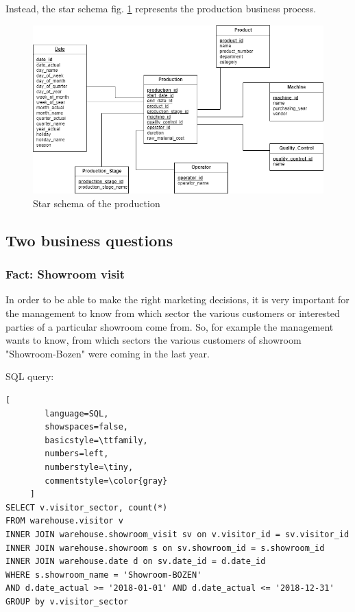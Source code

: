 \documentclass[letterpaper,12pt]{article}
\begin{document}
Instead, the star schema fig. \ref{fig:starschemaProduction} represents the production business process.

\begin{figure}[H] 
        \centering
        \includegraphics[width=\columnwidth]{../images/Starschema_Production.png}
        \caption{
                \label{fig:starschemaProduction}  
                Star schema of the production
        }
\end{figure}

\subsection{Two business questions}

\subsubsection{Fact: Showroom visit}

In order to be able to make the right marketing decisions, it is very important for the management to know from which sector the various customers or interested parties of a particular showroom come from. So, for example the management wants to know, from which sectors the various customers of showroom "Showroom-Bozen" were coming in the last year.

\bigskip
\noindent SQL query:
\begin{lstlisting}[
        language=SQL,
        showspaces=false,
        basicstyle=\ttfamily,
        numbers=left,
        numberstyle=\tiny,
        commentstyle=\color{gray}
     ]
SELECT v.visitor_sector, count(*)
FROM warehouse.visitor v
INNER JOIN warehouse.showroom_visit sv on v.visitor_id = sv.visitor_id
INNER JOIN warehouse.showroom s on sv.showroom_id = s.showroom_id
INNER JOIN warehouse.date d on sv.date_id = d.date_id
WHERE s.showroom_name = 'Showroom-BOZEN' 
AND d.date_actual >= '2018-01-01' AND d.date_actual <= '2018-12-31'
GROUP by v.visitor_sector
\end{lstlisting}
\end{document}
